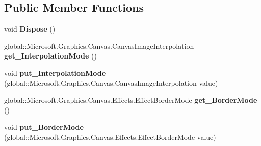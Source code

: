 \subsection*{Public Member Functions}
\begin{DoxyCompactItemize}
\item 
\mbox{\label{class_microsoft_1_1_graphics_1_1_canvas_1_1_effects_1_1_dpi_compensation_effect_af986b9bbf6e6ad3ab1adde3673a2c57c}} 
void {\bfseries Dispose} ()
\item 
\mbox{\label{class_microsoft_1_1_graphics_1_1_canvas_1_1_effects_1_1_dpi_compensation_effect_ab1505e3760906582e945043639fcfb16}} 
global\+::\+Microsoft.\+Graphics.\+Canvas.\+Canvas\+Image\+Interpolation {\bfseries get\+\_\+\+Interpolation\+Mode} ()
\item 
\mbox{\label{class_microsoft_1_1_graphics_1_1_canvas_1_1_effects_1_1_dpi_compensation_effect_ab95d5e8e9e140918df664c046fe70e53}} 
void {\bfseries put\+\_\+\+Interpolation\+Mode} (global\+::\+Microsoft.\+Graphics.\+Canvas.\+Canvas\+Image\+Interpolation value)
\item 
\mbox{\label{class_microsoft_1_1_graphics_1_1_canvas_1_1_effects_1_1_dpi_compensation_effect_a5640110355a62fb5ce7b280be6b2ead4}} 
global\+::\+Microsoft.\+Graphics.\+Canvas.\+Effects.\+Effect\+Border\+Mode {\bfseries get\+\_\+\+Border\+Mode} ()
\item 
\mbox{\label{class_microsoft_1_1_graphics_1_1_canvas_1_1_effects_1_1_dpi_compensation_effect_a2dbdf38c149aa690fe383653db643db6}} 
void {\bfseries put\+\_\+\+Border\+Mode} (global\+::\+Microsoft.\+Graphics.\+Canvas.\+Effects.\+Effect\+Border\+Mode value)
\item 
\mbox{\label{class_microsoft_1_1_graphics_1_1_canvas_1_1_effects_1_1_dpi_compensation_effect_aba9725fe6d69bf324f59bb8c77745665}} 

\end{DoxyCompactItemize}
